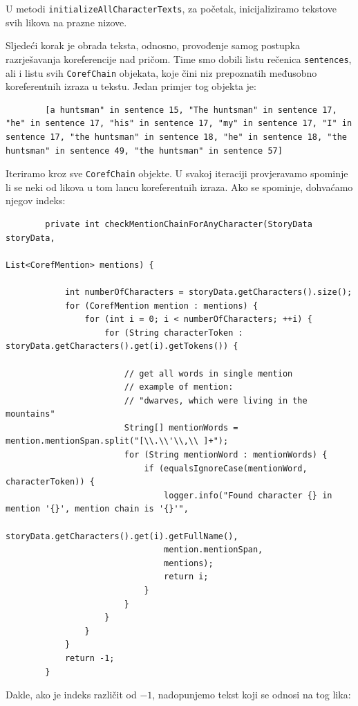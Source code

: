 \documentclass[a4paper,twoside,12pt]{memoir} %
\begin{document}
		\bigskip

		U metodi \texttt{initializeAllCharacterTexts}, za početak, inicijaliziramo tekstove svih likova na prazne nizove.

		Sljedeći korak je obrada teksta, odnosno, provođenje samog postupka raz\-rje\-ša\-va\-nja koreferencije nad pričom. Time smo dobili listu rečenica \texttt{sentences}, ali i listu svih \texttt{CorefChain} objekata, koje čini niz prepoznatih međusobno koreferentnih izraza u tekstu. Jedan primjer tog objekta je:

		\begin{lstlisting}
		[a huntsman" in sentence 15, "The huntsman" in sentence 17, "he" in sentence 17, "his" in sentence 17, "my" in sentence 17, "I" in sentence 17, "the huntsman" in sentence 18, "he" in sentence 18, "the huntsman" in sentence 49, "the huntsman" in sentence 57]
		\end{lstlisting}

		Iteriramo kroz sve \texttt{CorefChain} objekte. U svakoj iteraciji provjeravamo spominje li se neki od likova u tom lancu koreferentnih izraza. Ako se spominje, dohvaćamo njegov indeks:

		\begin{lstlisting}
		private int checkMentionChainForAnyCharacter(StoryData storyData,
																 List<CorefMention> mentions) {

			int numberOfCharacters = storyData.getCharacters().size();
			for (CorefMention mention : mentions) {
				for (int i = 0; i < numberOfCharacters; ++i) {
					for (String characterToken : storyData.getCharacters().get(i).getTokens()) {

						// get all words in single mention
						// example of mention:
						// "dwarves, which were living in the mountains"
						String[] mentionWords = mention.mentionSpan.split("[\\.\\'\\,\\ ]+");
						for (String mentionWord : mentionWords) {
							if (equalsIgnoreCase(mentionWord, characterToken)) {
								logger.info("Found character {} in mention '{}', mention chain is '{}'",
								storyData.getCharacters().get(i).getFullName(),
								mention.mentionSpan,
								mentions);
								return i;
							}
						}
					}
				}
			}
			return -1;
		}
		\end{lstlisting}

		Dakle, ako je indeks različit od $-1$, nadopunjemo tekst koji se odnosi na tog lika:
\end{document}
